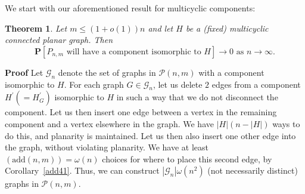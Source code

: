 \documentclass{article}
\newtheorem{Theorem}{Theorem}
\newtheorem{Proof of Theorem}{Proof of Theorem}
\begin{document}
\begin{figure}[omitted: a diagram of this paper's results, not reproduced here]\end{figure}





We start with our aforementioned result for multicyclic components: 















\begin{Theorem} \label{cyc41}
Let $m \leq (1+o(1))n$ and let $H$ be a (fixed) multicyclic connected planar graph.
Then
\begin{displaymath}
\mathbf{P}[P_{n,m} \textrm{ will have a component isomorphic to } H] \to 0 \textrm{ as } n \to \infty.
\end{displaymath}
\end{Theorem}
\textbf{Proof}
Let $\mathcal{G}_{n}$ denote the set of graphs in $\mathcal{P}(n,m)$ with a component isomorphic to $H$.
For each graph $G \in \mathcal{G}_{n}$,
let us delete $2$ edges from a component $H^{\prime} (=H^{\prime}_{G})$ isomorphic to $H$
in such a way that we do not disconnect the component.
Let us then insert one edge between a vertex in the remaining component and a vertex elsewhere in the graph.
We have $|H|(n-|H|)$ ways to do this, and planarity is maintained.
Let us then also insert one other edge into the graph,
without violating planarity.
We have at least $(\textrm{add}(n,m))=\omega(n)$ 
choices for where to place this second edge,
by Corollary~\ref{add41}.
Thus, we can construct $|\mathcal{G}_{n}| \omega \left( n^{2} \right)$ 
(not necessarily distinct) graphs in $\mathcal{P}(n,m)$.
\end{document}
